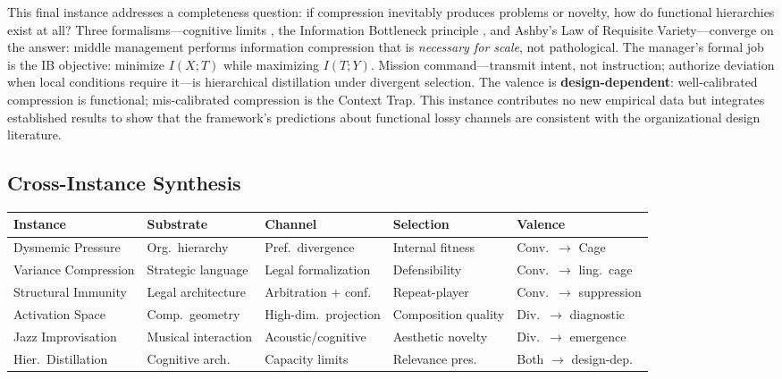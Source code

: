 \documentclass[12pt,letterpaper]{article}
\theoremstyle{definition}
\theoremstyle{remark}
\begin{document}
This final instance addresses a completeness question: if compression inevitably produces problems or novelty, how do functional hierarchies exist at all? Three formalisms---cognitive limits \citep{miller1956,sweller1988}, the Information Bottleneck principle \citep{tishby1999}, and Ashby's Law of Requisite Variety---converge on the answer: middle management performs information compression that is \emph{necessary for scale}, not pathological. The manager's formal job is the IB objective: minimize $I(X; T)$ while maximizing $I(T; Y)$. Mission command---transmit intent, not instruction; authorize deviation when local conditions require it---is hierarchical distillation under divergent selection. The valence is \textbf{design-dependent}: well-calibrated compression is functional; mis-calibrated compression is the Context Trap. This instance contributes no new empirical data but integrates established results to show that the framework's predictions about functional lossy channels are consistent with the organizational design literature.


\subsection{Cross-Instance Synthesis}

\begin{center}
\begin{tabular}{@{}lllll@{}}
\toprule
\textbf{Instance} & \textbf{Substrate} & \textbf{Channel} & \textbf{Selection} & \textbf{Valence} \\
\midrule
Dysmemic Pressure & Org.\ hierarchy & Pref.\ divergence & Internal fitness & Conv.\ $\to$ Cage \\
Variance Compression & Strategic language & Legal formalization & Defensibility & Conv.\ $\to$ ling.\ cage \\
Structural Immunity & Legal architecture & Arbitration + conf. & Repeat-player & Conv.\ $\to$ suppression \\
Activation Space & Comp.\ geometry & High-dim.\ projection & Composition quality & Div.\ $\to$ diagnostic \\
Jazz Improvisation & Musical interaction & Acoustic/cognitive & Aesthetic novelty & Div.\ $\to$ emergence \\
Hier.\ Distillation & Cognitive arch. & Capacity limits & Relevance pres. & Both $\to$ design-dep. \\
\bottomrule
\end{tabular}
\end{center}
\end{document}
